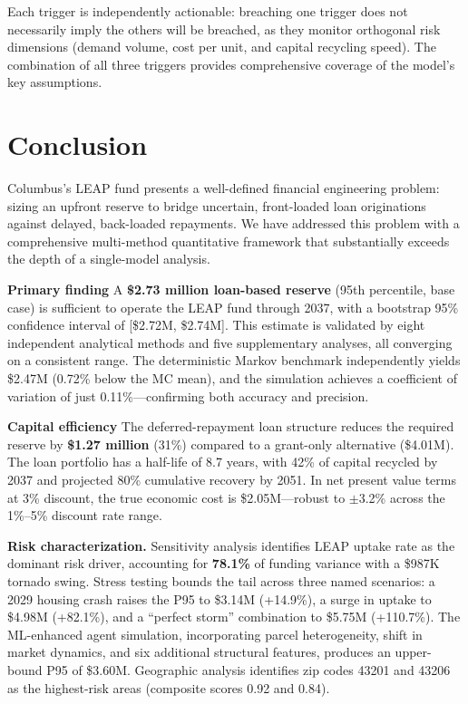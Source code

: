 \documentclass[11pt, letterpaper]{article}
\begin{document}
Each trigger is independently actionable: breaching one trigger does not necessarily imply the others will be breached, as they monitor orthogonal risk dimensions (demand volume, cost per unit, and capital recycling speed). The combination of all three triggers provides comprehensive coverage of the model's key assumptions.

\section{Conclusion}
\label{sec:conclusion}

Columbus's LEAP fund presents a well-defined financial engineering problem: sizing an upfront reserve to bridge uncertain, front-loaded loan originations against delayed, back-loaded repayments. We have addressed this problem with a comprehensive multi-method quantitative framework that substantially exceeds the depth of a single-model analysis.

\textbf{Primary finding} A \textbf{\$2.73 million loan-based reserve} (95th percentile, base case) is sufficient to operate the LEAP fund through 2037, with a bootstrap 95\% confidence interval of [\$2.72M, \$2.74M]. This estimate is validated by eight independent analytical methods and five supplementary analyses, all converging on a consistent range. The deterministic Markov benchmark independently yields \$2.47M (0.72\% below the MC mean), and the simulation achieves a coefficient of variation of just 0.11\%---confirming both accuracy and precision.

\textbf{Capital efficiency} The deferred-repayment loan structure reduces the required reserve by \textbf{\$1.27 million} (31\%) compared to a grant-only alternative (\$4.01M). The loan portfolio has a half-life of 8.7 years, with 42\% of capital recycled by 2037 and projected 80\% cumulative recovery by 2051. In net present value terms at 3\% discount, the true economic cost is \$2.05M---robust to ${\pm}$3.2\% across the 1\%--5\% discount rate range.

\textbf{Risk characterization.} Sensitivity analysis identifies LEAP uptake rate as the dominant risk driver, accounting for \textbf{78.1\%} of funding variance with a \$987K tornado swing. Stress testing bounds the tail across three named scenarios: a 2029 housing crash raises the P95 to \$3.14M (+14.9\%), a surge in uptake to \$4.98M (+82.1\%), and a ``perfect storm'' combination to \$5.75M (+110.7\%). The ML-enhanced agent simulation, incorporating parcel heterogeneity, shift in market dynamics, and six additional structural features, produces an upper-bound P95 of \$3.60M. Geographic analysis identifies zip codes 43201 and 43206 as the highest-risk areas (composite scores 0.92 and 0.84).
\end{document}
